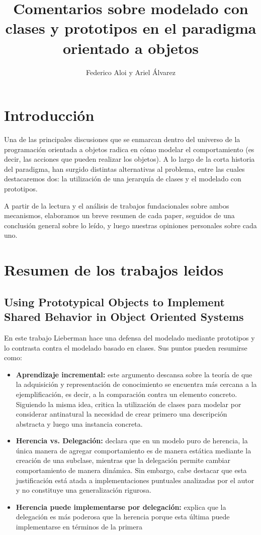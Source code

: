 \documentclass[a4paper,10pt]{article}
\title{Comentarios sobre modelado con clases y prototipos en el paradigma orientado a objetos}
\author{Federico Aloi y Ariel Álvarez}
\newcommand{\strongitem}[1]{\item \textbf{#1:}}
\begin{document}
\maketitle

\section{Introducción}
Una de las principales discusiones que se enmarcan dentro del universo de la programación orientada a objetos radica en cómo modelar el comportamiento (es decir, las acciones que pueden realizar los objetos). A lo largo de la corta historia del paradigma, han surgido distintas alternativas al problema, entre las cuales destacaremos dos: la utilización de una jerarquía de clases y el modelado con prototipos.

A partir de la lectura y el análisis de trabajos fundacionales sobre ambos mecanismos, elaboramos un breve resumen de cada paper, seguidos de una conclusión general sobre lo leído, y luego nuestras opiniones personales sobre cada uno.

\section{Resumen de los trabajos leidos}

\subsection{Using Prototypical Objects to Implement Shared Behavior in Object Oriented Systems}

En este trabajo Lieberman hace una defensa del modelado mediante prototipos y lo contrasta contra el modelado basado en clases. Sus puntos pueden resumirse como:

\begin{itemize}
	\strongitem{Aprendizaje incremental} este argumento descansa sobre la teoría de que la adquisición y representación de conocimiento se encuentra más cercana a la ejemplificación, es decir, a la comparación contra un elemento concreto. Siguiendo la misma idea, critica la utilización de clases para modelar por considerar antinatural la necesidad de crear primero una descripción abstracta y luego una instancia concreta. 
	\strongitem{Herencia vs. Delegación} declara que en un modelo puro de herencia, la única manera de agregar comportamiento es de manera estática mediante la creación de una subclase, mientras que la delegación permite cambiar comportamiento de manera dinámica. Sin embargo, cabe destacar que esta justificación está atada a implementaciones puntuales analizadas por el autor y no constituye una generalización rigurosa.
	\strongitem{Herencia puede implementarse por delegación} explica que la delegación es más poderosa que la herencia porque esta última puede implementarse en términos de la primera
\end{itemize}
\end{document}

